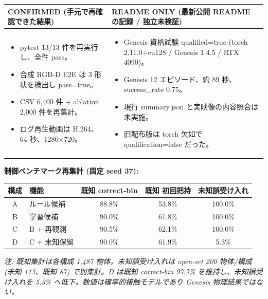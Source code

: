 \documentclass[11pt, a4paper]{article}
\begin{document}
\noindent
\begin{tabularx}{\textwidth}{@{} X X @{}}
\textbf{CONFIRMED (手元で再確認できた結果)} & \textbf{README ONLY (最新公開 README の記録 / 独立未検証)} \\
\hline
\begin{itemize}
    \item pytest 13/13 件を再実行し、全件 pass。
    \item 合成 RGB-D E2E は 3 形状を検出し pass=true。
    \item CSV 6,400 件 + ablation 2,000 件を再集計。
    \item ログ再生動画は H.264、64 秒、1280$\times$720。
\end{itemize}
&
\begin{itemize}
    \item Genesis 資格試験 qualified=true (torch 2.11.0+cu128 / Genesis 1.4.5 / RTX 4090)。
    \item Genesis 12 エピソード、約 89 秒、success\_rate 0.75。
    \item 現行 summary.json と実映像の内容照合は未実施。
    \item 旧配布版は torch 欠如で qualification=false だった。
\end{itemize}
\\
\end{tabularx}

\vspace{2mm}
\noindent
\textbf{制御ベンチマーク再集計 (固定 seed 37):}
\begin{table}[h!]
\centering
\small
\begin{tabularx}{\textwidth}{@{} c X c c c @{}}
\toprule
\textbf{構成} & \textbf{機能} & \textbf{既知 correct-bin} & \textbf{既知 初回把持} & \textbf{未知誤受け入れ} \\
\midrule
A & ルール候補 & 88.8\% & 53.8\% & 100.0\% \\
B & 学習候補 & 90.0\% & 61.8\% & 100.0\% \\
C & B + 再観測 & 90.5\% & 62.1\% & 100.0\% \\
D & C + 未知保留 & 90.0\% & 61.9\% & 5.3\% \\
\bottomrule
\end{tabularx}
\end{table}
\textit{注: 既知集計は各構成 1,487 物体。未知誤受け入れは open-set 200 物体/構成 (未知 113、既知 87) で別集計。D は既知 correct-bin 97.7\% を維持し、未知誤受け入れを 5.3\% へ低下。数値は確率的接触モデルであり Genesis 物理結果ではない。}
\end{document}
